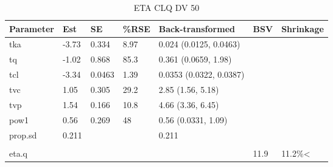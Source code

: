 \begin{table}
\centering\centering
\caption{ETA CLQ DV 50}
\centering
\fontsize{8}{10}\selectfont
\begin{tabular}[t]{lllllll}
\toprule
\textbf{Parameter} & \textbf{Est} & \textbf{SE} & \textbf{\%RSE} & \textbf{Back-transformed} & \textbf{BSV} & \textbf{Shrinkage}\\
\midrule
tka & -3.73 & 0.334 & 8.97 & 0.024 (0.0125, 0.0463) &  & \\
\midrule
tq & -1.02 & 0.868 & 85.3 & 0.361 (0.0659, 1.98) &  & \\
\midrule
tcl & -3.34 & 0.0463 & 1.39 & 0.0353 (0.0322, 0.0387) &  & \\
\midrule
tvc & 1.05 & 0.305 & 29.2 & 2.85 (1.56, 5.18) &  & \\
\midrule
tvp & 1.54 & 0.166 & 10.8 & 4.66 (3.36, 6.45) &  & \\
\midrule
pow1 & 0.56 & 0.269 & 48 & 0.56 (0.0331, 1.09) &  & \\
\midrule
prop.sd & 0.211 &  &  & 0.211 &  & \\
\midrule\\
eta.q &  &  &  &  & 11.9 & 11.2\%<\\
\bottomrule
\end{tabular}
\end{table}